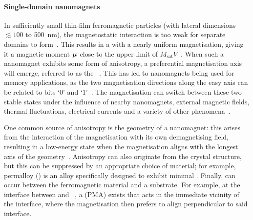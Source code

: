 \paragraph{Single-domain nanomagnets}
In sufficiently small thin-film ferromagnetic particles (with lateral dimensions $\lesssim 100$ to \SI{500}{\nano\metre}), the magnetostatic interaction is too weak for separate domains to form~\cite{Kittel_TheoryFMDomains,BrownThermalFluctuations}.
This results in a  with a nearly uniform magnetisation, giving it a magnetic moment $\boldsymbol{\mathbf{\mu}}$ close to the upper limit of $M_\mathrm{sat}V$~\cite{FRENKEL1930,neel1949theorie}. %
When such a nanomagnet exhibits some form of anisotropy, a preferential magnetisation axis will emerge, referred to as the ~\cite{nisoli2013colloquium}.
This has led to nanomagnets being used for memory applications, as the two magnetisation directions along the easy axis can be related to bits `0' and `1'~\cite{MQCA_RoomTemp,NML_Carlton,Gypens_Balanced,Gypens_SelfOrganizing,JM_Masterproef}.
The magnetisation can switch between these two stable states under the influence of nearby nanomagnets, external magnetic fields, thermal fluctuations, electrical currents and a variety of other phenomena~\cite{SwitchingForced_EnergyEfficient,BrownThermalFluctuations,neel1949theorie}. \par
One common source of anisotropy is the geometry of a nanomagnet: this  arises from the interaction of the magnetisation with its own demagnetising field, resulting in a low-energy state when the magnetisation aligns with the longest axis of the geometry~\cite{MagneticCharge}.
Anisotropy can also originate from the crystal structure, but this can be suppressed by an appropriate choice of material; for example, permalloy () is an alloy specifically designed to exhibit minimal .
Finally,  can occur between the ferromagnetic material and a substrate.
For example, at the interface between  and ~\cite{PMA_PdCo_PtCo}, a  (PMA) exists that acts in the immediate vicinity of the interface, where the magnetisation then prefers to align perpendicular to said interface.


